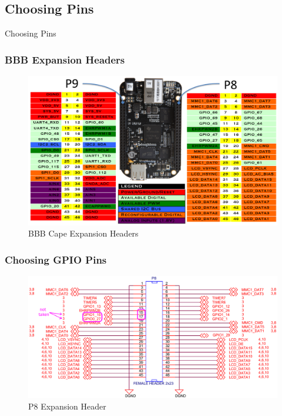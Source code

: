 \documentclass[aspectratio=169,usenames,dvipsnames]{beamer}
\begin{document}
\subsection{Choosing Pins}

\begin{frame}[standout]
  Choosing Pins
\end{frame}

\begin{frame}
  \frametitle{BBB Expansion Headers}
  \begin{figure}
    \centering
    \includegraphics[scale=0.29]{images/expansion-headers.png}
    \caption{BBB Cape Expansion Headers}
  \end{figure}
  \vspace*{-10mm}
\end{frame}

\begin{frame}
  \frametitle{Choosing GPIO Pins}
  \begin{figure}
    \centering
    \includegraphics[scale=0.29]{images/p8.png}
    \caption{P8 Expansion Header}
  \end{figure}
  \vspace*{-10mm}
\end{frame}
\end{document}
